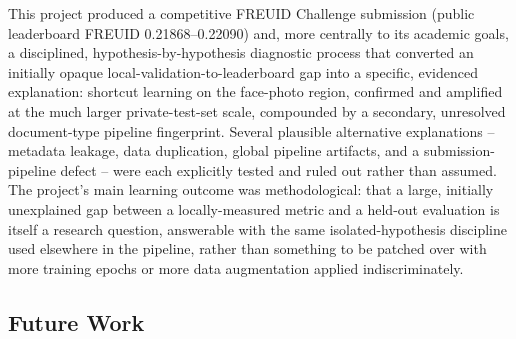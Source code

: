 \documentclass{article}
\begin{document}
This project produced a competitive FREUID Challenge submission (public
leaderboard FREUID 0.21868--0.22090) and, more centrally to its academic
goals, a disciplined, hypothesis-by-hypothesis diagnostic process that
converted an initially opaque local-validation-to-leaderboard gap into a
specific, evidenced explanation: shortcut learning on the face-photo
region, confirmed and amplified at the much larger private-test-set scale,
compounded by a secondary, unresolved document-type pipeline fingerprint.
Several plausible alternative explanations -- metadata leakage, data
duplication, global pipeline artifacts, and a submission-pipeline defect --
were each explicitly tested and ruled out rather than assumed. The
project's main learning outcome was methodological: that a large,
initially unexplained gap between a locally-measured metric and a
held-out evaluation is itself a research question, answerable with the
same isolated-hypothesis discipline used elsewhere in the pipeline, rather
than something to be patched over with more training epochs or more
data augmentation applied indiscriminately.

\subsection{Future Work}
\label{sec:future-work}
\end{document}
